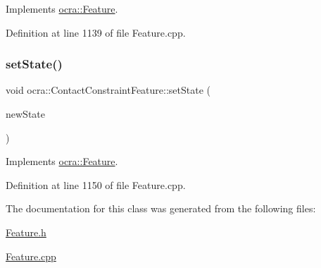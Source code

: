 Implements \hyperlink{classocra_1_1Feature_a792434ceb793f25874b8fe42ae24c475}{ocra\+::\+Feature}.



Definition at line 1139 of file Feature.\+cpp.

\hypertarget{classocra_1_1ContactConstraintFeature_a1bbc7ca568a64aed7704118b8eeaf6d1}{}\label{classocra_1_1ContactConstraintFeature_a1bbc7ca568a64aed7704118b8eeaf6d1} 
\subsubsection{\texorpdfstring{set\+State()}{setState()}}
{\footnotesize\ttfamily void ocra\+::\+Contact\+Constraint\+Feature\+::set\+State (\begin{DoxyParamCaption}\item[{const \hyperlink{classocra_1_1TaskState}{Task\+State} \&}]{new\+State }\end{DoxyParamCaption})\hspace{0.3cm}{\ttfamily [virtual]}}



Implements \hyperlink{classocra_1_1Feature_ad16d6b176b229280649ab405531e9a30}{ocra\+::\+Feature}.



Definition at line 1150 of file Feature.\+cpp.



The documentation for this class was generated from the following files\+:\begin{DoxyCompactItemize}
\item 
\hyperlink{Feature_8h}{Feature.\+h}\item 
\hyperlink{Feature_8cpp}{Feature.\+cpp}\end{DoxyCompactItemize}
